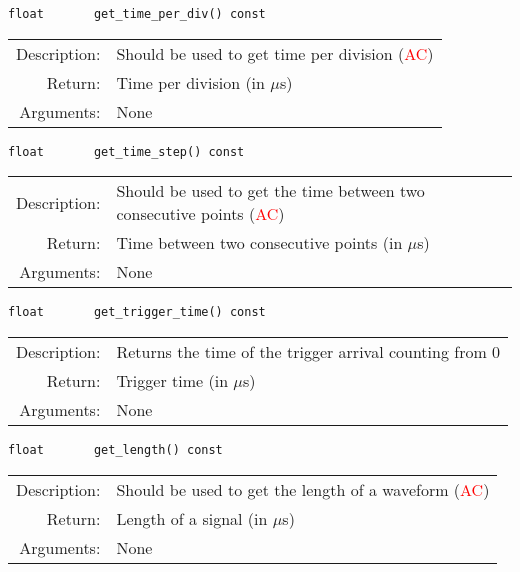 \begin{lstlisting}
float       get_time_per_div() const
\end{lstlisting}
\begin{tabularx}{\textwidth}{rp{11cm}}
    \toprule
    Description: & Should be used to get time per division (\textcolor{red}{AC})\\
    Return: & Time per division (in $\mu$s)\\
    Arguments: & None\\
    \bottomrule
\end{tabularx}
\vspace{1cm}

\begin{lstlisting}
float       get_time_step() const
\end{lstlisting}
\begin{tabularx}{\textwidth}{rp{11cm}}
    \toprule
    Description: & Should be used to get the time between two consecutive points (\textcolor{red}{AC})\\
    Return: & Time between two consecutive points (in $\mu$s)\\
    Arguments: & None\\
    \bottomrule
\end{tabularx}
\vspace{1cm}

\begin{lstlisting}
float       get_trigger_time() const
\end{lstlisting}
\begin{tabularx}{\textwidth}{rp{11cm}}
    \toprule
    Description: & Returns the time of the trigger arrival counting from 0\\
    Return: & Trigger time (in $\mu$s)\\
    Arguments: & None\\
    \bottomrule
\end{tabularx}
\vspace{1cm}

\begin{lstlisting}
float       get_length() const
\end{lstlisting}
\begin{tabularx}{\textwidth}{rp{11cm}}
    \toprule
    Description: & Should be used to get the length of a waveform (\textcolor{red}{AC})\\
    Return: & Length of a signal (in $\mu$s)\\
    Arguments: & None\\
    \bottomrule
\end{tabularx}
\vspace{1cm}

